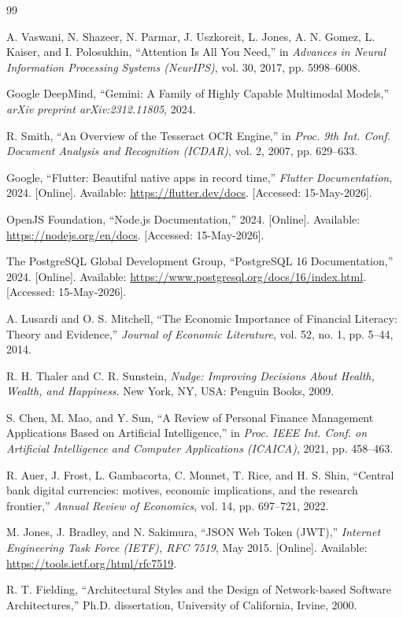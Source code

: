 \begin{thebibliography}{99}

A. Vaswani, N. Shazeer, N. Parmar, J. Uszkoreit, L. Jones, A. N. Gomez, L. Kaiser, and I. Polosukhin, ``Attention Is All You Need,'' in \textit{Advances in Neural Information Processing Systems (NeurIPS)}, vol. 30, 2017, pp. 5998--6008.

Google DeepMind, ``Gemini: A Family of Highly Capable Multimodal Models,'' \textit{arXiv preprint arXiv:2312.11805}, 2024.

R. Smith, ``An Overview of the Tesseract OCR Engine,'' in \textit{Proc. 9th Int. Conf. Document Analysis and Recognition (ICDAR)}, vol. 2, 2007, pp. 629--633.

Google, ``Flutter: Beautiful native apps in record time,'' \textit{Flutter Documentation}, 2024. [Online]. Available: \url{https://flutter.dev/docs}. [Accessed: 15-May-2026].

OpenJS Foundation, ``Node.js Documentation,'' 2024. [Online]. Available: \url{https://nodejs.org/en/docs}. [Accessed: 15-May-2026].

The PostgreSQL Global Development Group, ``PostgreSQL 16 Documentation,'' 2024. [Online]. Available: \url{https://www.postgresql.org/docs/16/index.html}. [Accessed: 15-May-2026].

A. Lusardi and O. S. Mitchell, ``The Economic Importance of Financial Literacy: Theory and Evidence,'' \textit{Journal of Economic Literature}, vol. 52, no. 1, pp. 5--44, 2014.

R. H. Thaler and C. R. Sunstein, \textit{Nudge: Improving Decisions About Health, Wealth, and Happiness}. New York, NY, USA: Penguin Books, 2009.

S. Chen, M. Mao, and Y. Sun, ``A Review of Personal Finance Management Applications Based on Artificial Intelligence,'' in \textit{Proc. IEEE Int. Conf. on Artificial Intelligence and Computer Applications (ICAICA)}, 2021, pp. 458--463.

R. Auer, J. Frost, L. Gambacorta, C. Monnet, T. Rice, and H. S. Shin, ``Central bank digital currencies: motives, economic implications, and the research frontier,'' \textit{Annual Review of Economics}, vol. 14, pp. 697--721, 2022.

M. Jones, J. Bradley, and N. Sakimura, ``JSON Web Token (JWT),'' \textit{Internet Engineering Task Force (IETF), RFC 7519}, May 2015. [Online]. Available: \url{https://tools.ietf.org/html/rfc7519}.

R. T. Fielding, ``Architectural Styles and the Design of Network-based Software Architectures,'' Ph.D. dissertation, University of California, Irvine, 2000.

\end{thebibliography}
